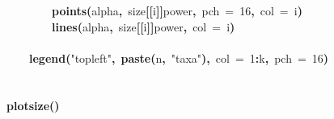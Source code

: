 \documentclass{elsarticle}
\makeatletter
\newcommand{\hlnumber}[1]{\textcolor[rgb]{0,0,0}{#1}}%
\newcommand{\hlfunctioncall}[1]{\textcolor[rgb]{.5,0,.33}{\textbf{#1}}}%
\newcommand{\hlstring}[1]{\textcolor[rgb]{.6,.6,1}{#1}}%
\newcommand{\hlkeyword}[1]{\textbf{#1}}%
\newcommand{\hlargument}[1]{\textcolor[rgb]{.69,.25,.02}{#1}}%
\newcommand{\hlsymbol}[1]{#1}%
\newcommand{\hlstd}[1]{\textcolor[rgb]{0,0,0}{#1}}%
\newenvironment{kframe}{%
 \def\FrameCommand##1{\hskip\@totalleftmargin \hskip-\fboxsep
 \colorbox{shadecolor}{##1}\hskip-\fboxsep
     \hskip-\linewidth \hskip-\@totalleftmargin \hskip\columnwidth}%
 \MakeFramed {\advance\hsize-\width
   \@totalleftmargin\z@ \linewidth\hsize
   \@setminipage}}%
 {\par\unskip\endMakeFramed}
\newenvironment{knitrout}{}{} %
\makeatother
\begin{document}
\begin{figure}
\begin{center}
\begin{knitrout}
{\begin{kframe}
\begin{flushleft}
\hlstd{}{\ }{\ }{\ }{\ }{\ }{\ }{\ }{\ }\hlfunctioncall{points}\hlkeyword{(}\hlsymbol{alpha}\hlkeyword{,}{\ }\hlsymbol{size}\hlkeyword{[[}\hlsymbol{i}\hlkeyword{]}\hlkeyword{]}\hlkeyword{\usebox{\hlnormalsizeboxdollar}}\hlsymbol{power}\hlkeyword{,}{\ }\hlargument{pch}{\ }\hlargument{=}{\ }\hlnumber{16}\hlkeyword{,}{\ }\hlargument{col}{\ }\hlargument{=}{\ }\hlsymbol{i}\hlkeyword{)}\hspace*{\fill}\\
\hlstd{}{\ }{\ }{\ }{\ }{\ }{\ }{\ }{\ }\hlfunctioncall{lines}\hlkeyword{(}\hlsymbol{alpha}\hlkeyword{,}{\ }\hlsymbol{size}\hlkeyword{[[}\hlsymbol{i}\hlkeyword{]}\hlkeyword{]}\hlkeyword{\usebox{\hlnormalsizeboxdollar}}\hlsymbol{power}\hlkeyword{,}{\ }\hlargument{col}{\ }\hlargument{=}{\ }\hlsymbol{i}\hlkeyword{)}\hspace*{\fill}\\
\hlstd{}{\ }{\ }{\ }{\ }\hlkeyword{\usebox{\hlnormalsizeboxclosebrace}}\hspace*{\fill}\\
\hlstd{}{\ }{\ }{\ }{\ }\hlfunctioncall{legend}\hlkeyword{(}\hlstring{"{}topleft"{}}\hlkeyword{,}{\ }\hlfunctioncall{paste}\hlkeyword{(}\hlsymbol{n}\hlkeyword{,}{\ }\hlstring{"{}taxa"{}}\hlkeyword{)}\hlkeyword{,}{\ }\hlargument{col}{\ }\hlargument{=}{\ }\hlnumber{1}\hlkeyword{:}\hlsymbol{k}\hlkeyword{,}{\ }\hlargument{pch}{\ }\hlargument{=}{\ }\hlnumber{16}\hlkeyword{)}\hspace*{\fill}\\
\hlstd{}\hspace*{\fill}\\
\hlstd{}\hlkeyword{\usebox{\hlnormalsizeboxclosebrace}}\hspace*{\fill}\\
\hlstd{}\hlfunctioncall{plot\usebox{\hlnormalsizeboxunderscore}size}\hlkeyword{(}\hlkeyword{)}\mbox{}
\normalfont
\end{flushleft}



\end{kframe}}
\end{knitrout}
\end{center}
\end{figure}
\end{document}
